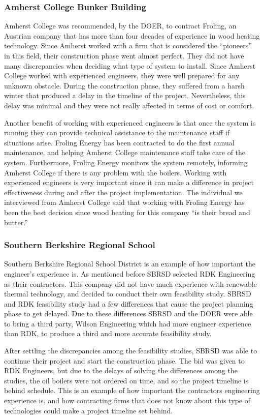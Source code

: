 \subsubsection{Amherst College Bunker Building}
\par Amherst College was recommended, by the DOER, to contract Froling, an Austrian company that has more than four decades of experience in wood heating technology. Since Amherst worked with a firm that is considered the “pioneers” in this field, their construction phase went almost perfect. They did not have many discrepancies when deciding what type of system to install. Since Amherst College worked with experienced engineers, they were well prepared for any unknown obstacle. During the construction phase, they suffered from a harsh winter that produced a delay in the timeline of the project. Nevertheless, this delay was minimal and they were not really affected in terms of cost or comfort.
\par Another benefit of working with experienced engineers is that once the system is running they can provide technical assistance to the maintenance staff if situations arise. Froling Energy has been contracted to do the first annual maintenance, and helping Amherst College maintenance staff take care of the system. Furthermore, Froling Energy monitors the system remotely, informing Amherst College if there is any problem with the boilers. Working with experienced engineers is very important since it can make a difference in project effectiveness during and after the project implementation. The individual we interviewed from Amherst College said that working with Froling Energy has been the best decision since wood heating for this company “is their bread and butter.”

\subsubsection{Southern Berkshire Regional School}
\par Southern Berkshire Regional School District is an example of how important the engineer's experience is. As mentioned before SBRSD selected RDK Engineering as their contractors. This company did not have much experience with renewable thermal technology, and decided to conduct their own feasibility study. SBRSD and RDK feasibility study had a few differences that cause the project planning phase to get delayed. Due to these differences SBRSD and the DOER were able to bring a third party, Wilson Engineering which had more engineer experience than RDK, to produce a third and more accurate feasibility study.
\par After settling the discrepancies among the feasibility studies, SBRSD was able to continue their project and start the construction phase. The bid was given to RDK Engineers, but due to the delays of solving the differences among the studies, the oil boilers were not ordered on time, and so the project timeline is behind schedule. This is an example of how important the contractors engineering experience is, and how contracting firms that does not know about this type of technologies could make a project timeline set behind.

